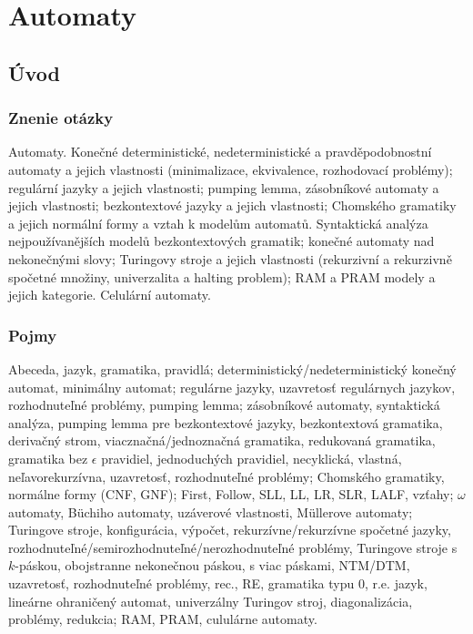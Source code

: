 \section{Automaty}

\subsection{Úvod}
\subsubsection{Znenie otázky}
Automaty. Konečné deterministické, nedeterministické a pravděpodobnostní 
automaty a jejich vlastnosti (minimalizace, ekvivalence, rozhodovací problémy); 
regulární jazyky a jejich vlastnosti; pumping lemma, zásobníkové 
automaty a jejich vlastnosti; bezkontextové jazyky a jejich vlastnosti; 
Chomského gramatiky a jejich normální formy a vztah k modelům automatů. 
Syntaktická analýza nejpoužívanějších modelů bezkontextových gramatik; 
konečné automaty nad nekonečnými slovy; Turingovy stroje a jejich vlastnosti 
(rekurzivní a rekurzivně spočetné množiny, univerzalita a halting problem); 
RAM a PRAM modely a jejich kategorie. Celulární automaty.

\subsubsection{Pojmy}
Abeceda, jazyk, gramatika, pravidlá; deterministický/nedeterministický konečný automat, 
minimálny automat; regulárne jazyky, uzavretosť regulárnych jazykov, rozhodnuteľné
problémy, pumping lemma; zásobníkové automaty, syntaktická analýza, pumping lemma
pre bezkontextové jazyky, bezkontextová gramatika, derivačný strom,
viacznačná/jednoznačná gramatika, redukovaná gramatika, gramatika
bez $\epsilon$ pravidiel, jednoduchých pravidiel, necyklická, vlastná,
neľavorekurzívna, uzavretosť, rozhodnuteľné problémy;
Chomského gramatiky, normálne formy (CNF, GNF);
First, Follow, SLL, LL, LR, SLR, LALF, vzťahy;
$\omega$ automaty, Büchiho automaty, uzáverové vlastnosti, 
Müllerove automaty; Turingove stroje, konfigurácia, výpočet,
rekurzívne/rekurzívne spočetné jazyky, rozhodnuteľné/semirozhodnuteľné/nerozhodnuteľné problémy,
Turingove stroje s $k$-páskou, obojstranne nekonečnou páskou, 
s viac páskami, NTM/DTM, uzavretosť, rozhodnuteľné problémy,
rec., RE, gramatika typu $0$, r.e. jazyk, lineárne ohraničený automat,
univerzálny Turingov stroj, diagonalizácia, problémy, redukcia;
RAM, PRAM, cululárne automaty.

